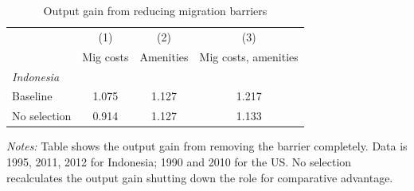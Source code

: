 \begin{table}[hbpt] \begin{center}\begin{threeparttable}\caption{ {Output gain from reducing migration barriers }} \begin{tabular}{l*{3}c} \toprule
&(1)&(2)&(3)\\
&Mig costs&Amenities&Mig costs, amenities\\
\midrule
\multicolumn{4}{l}{\emph{Indonesia}} \\Baseline&1.075&1.127&1.217\\
No selection&0.914&1.127&1.133\\
\midrule
\bottomrule \end{tabular} \label{Output gain from reducing migration barriers } \begin{tablenotes} \item {\footnotesize \emph{Notes: } Table shows the output gain from removing the barrier completely. Data is 1995, 2011, 2012 for Indonesia; 1990 and 2010 for the US. No selection recalculates the output gain shutting down the role for comparative advantage. } \end{tablenotes} \end{threeparttable} \end{center} \end{table}
